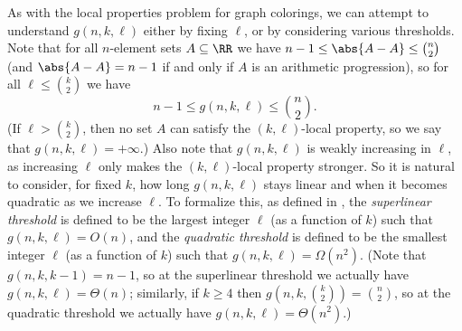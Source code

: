 As with the local properties problem for graph colorings, we can attempt to understand $g(n, k, \ell)$ either by fixing $\ell$, or by considering various thresholds. Note that for all $n$-element sets $A \subseteq \RR$ we have $n - 1 \leq \abs{A - A} \leq \binom{n}{2}$ (and $\abs{A - A} = n - 1$ if and only if $A$ is an arithmetic progression), so for all $\ell \leq \binom{k}{2}$ we have \[n - 1 \leq g(n, k, \ell) \leq \binom{n}{2}.\] (If $\ell > \binom{k}{2}$, then no set $A$ can satisfy the $(k, \ell)$-local property, so we say that $g(n, k, \ell) = +\infty$.) Also note that $g(n, k, \ell)$ is weakly increasing in $\ell$, as increasing $\ell$ only makes the $(k, \ell)$-local property stronger. So it is natural to consider, for fixed $k$, how long $g(n, k, \ell)$ stays linear and when it becomes quadratic as we increase $\ell$. To formalize this, as defined in \cite{Li22}, the \emph{superlinear threshold} is defined to be the largest integer $\ell$ (as a function of $k$) such that $g(n, k, \ell) = O(n)$, and the \emph{quadratic threshold} is defined to be the smallest integer $\ell$ (as a function of $k$) such that $g(n, k, \ell) = \Omega(n^2)$. (Note that $g(n, k, k - 1) = n - 1$, so at the superlinear threshold we actually have $g(n, k, \ell) = \Theta(n)$; similarly, if $k \geq 4$ then $g(n, k, \binom{k}{2}) = \binom{n}{2}$, so at the quadratic threshold we actually have $g(n, k, \ell) = \Theta(n^2)$.)  
